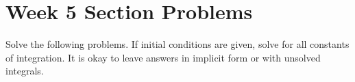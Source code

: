 \documentclass[letterpaper, fontsize=11pt]{scrartcl}
\numberwithin{equation}{section} %
\numberwithin{figure}{section} %
\numberwithin{table}{section} %
\begin{document}

\newcommand{\horrule}[1]{\rule{\linewidth}{#1}} %


\section*{Week 5 Section Problems}
\par Solve the following problems. If initial conditions are given, solve for all constants of integration. It is okay to leave answers in implicit form or with unsolved integrals. 
\end{document}
